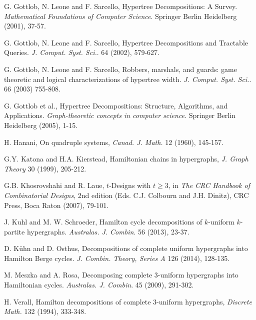 \begin{thebibliography}{99}
  G. Gottlob, N. Leone and F. Sarcello,
  Hypertree Decompositions: A Survey.
  {\em Mathematical Foundations of Computer Science}.
  Springer Berlin Heidelberg (2001), 37-57.

  G. Gottlob, N. Leone and F. Sarcello,
  Hypertree Decompositions and Tractable Queries.
  {\em J. Comput. Syst. Sci.}. 64 (2002), 579-627.

  G. Gottlob, N. Leone and F. Sarcello,
  Robbers, marshals, and guards: game theoretic and logical characterizations of
  hypertree width.
  {\em J. Comput. Syst. Sci.}. 66 (2003) 755-808.

  G. Gottlob et al.,
  Hypertree Decompositions: Structure, Algorithms, and Applications.
  {\em Graph-theoretic concepts in computer science}.
  Springer Berlin Heidelberg (2005), 1-15.

  H. Hanani,
  On quadruple systems,
  {\em Canad. J. Math.} 12 (1960), 145-157.

  G.Y. Katona and H.A. Kierstead,
  Hamiltonian chains in hypergraphs,
  {\em J. Graph Theory} 30 (1999), 205-212.

  G.B. Khosrovshahi and R. Laue,
  $t$-Designs with $t \geq 3$,
  in {\em The CRC Handbook of Combinatorial Designs}, 2nd edition
  (Eds. C.J. Colbourn and J.H. Dinitz),
  CRC Press, Boca Raton (2007), 79-101.

  J. Kuhl and M. W. Schroeder,
  Hamilton cycle decompositions of $k$-uniform $k$-partite hypergraphs.
  {\em Australas. J. Combin}. 56 (2013), 23-37.

  D. K\"{u}hn and D. Osthus,
  Decompositions of complete uniform hypergraphs into Hamilton Berge cycles.
  {\em J. Combin. Theory, Series A} 126 (2014), 128-135.

  M. Meszka and A. Rosa,
  Decomposing complete 3-uniform hypergraphs into Hamiltonian cycles.
  {\em Australas. J. Combin}. 45 (2009), 291-302.

  H. Verall,
  Hamilton decompositions of complete 3-uniform hypergraphs,
  {\em Discrete Math.} 132 (1994), 333-348.


\end{thebibliography}